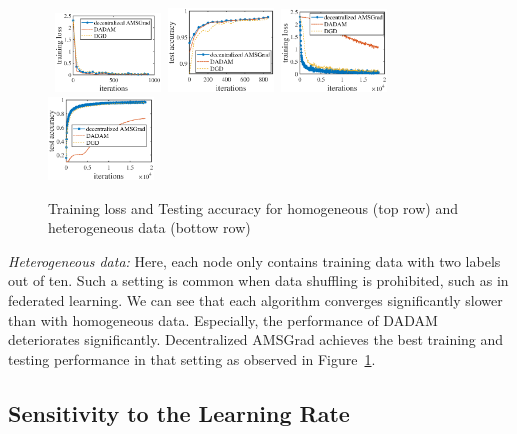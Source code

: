 \documentclass[anon,12pt]{colt2021} %
\begin{document}
\vspace{-0.1in}
\begin{figure}[H]
    \begin{center}
\mbox{
	\includegraphics[width=0.25\textwidth]{train_loss_updated.eps}
    \includegraphics[width=0.25\textwidth]{test_acc_updated.eps}
	\includegraphics[width=0.25\textwidth]{ub_train_loss.eps}
	\includegraphics[width=0.25\textwidth]{ub_test.eps}
	}
    \end{center}
\caption{Training loss and Testing accuracy for homogeneous (top row) and heterogeneous data (bottow row)}
	\label{fig: homo_data}
\end{figure}
\vspace{-0.15in}

\textit{Heterogeneous data:}
Here, each node only contains training data with two labels out of ten. {Such a setting is common when data shuffling is prohibited, such as in  federated learning.}
We can see that each algorithm converges significantly slower than with homogeneous data. 
Especially, the performance of DADAM deteriorates significantly. 
Decentralized AMSGrad achieves the best training and testing performance in that setting as observed in Figure~\ref{fig: homo_data}.

\vspace{-0.1in}
\subsection{Sensitivity to the Learning Rate}
\vspace{-0.05in}
\end{document}
